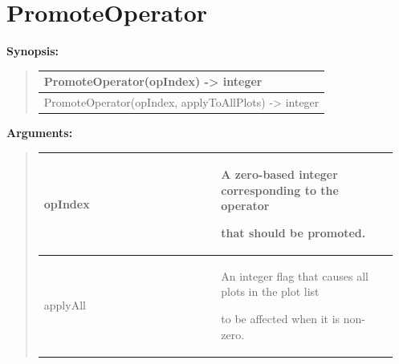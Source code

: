 \documentclass[letterpaper,10pt,english]{sphinxmanual}
\begin{document}
\section{PromoteOperator}
\label{functions:promoteoperator}
\begin{DUlineblock}{0em}
\item[] \textbf{Synopsis:}
\end{DUlineblock}
\begin{quote}

\begin{tabulary}{\linewidth}{|L|}
\hline

PromoteOperator(opIndex) -\textgreater{} integer
\\
\hline
PromoteOperator(opIndex, applyToAllPlots) -\textgreater{} integer
\\
\hline\end{tabulary}

\end{quote}

\begin{DUlineblock}{0em}
\item[] 
\item[] \textbf{Arguments:}
\end{DUlineblock}
\begin{quote}

\begin{tabular}{|p{0.475\linewidth}|p{0.475\linewidth}|}
\hline

opIndex
 & 
\begin{DUlineblock}{0em}
\item[] A zero-based integer corresponding to the operator
\item[] that should be promoted.
\end{DUlineblock}
\\
\hline
applyAll
 & 
\begin{DUlineblock}{0em}
\item[] An integer flag that causes all plots in the plot list
\item[] to be affected when it is non-zero.
\end{DUlineblock}
\\
\hline\end{tabular}

\end{quote}
\end{document}
